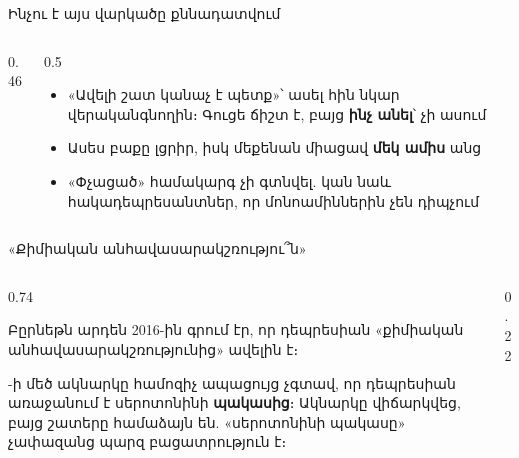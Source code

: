 \begin{frame}{Ինչու է այս վարկածը քննադատվում}
  \begin{columns}[c]
    \begin{column}{0.46\textwidth}
      \centering
      
    \end{column}
    \begin{column}{0.5\textwidth}
      \begin{itemize}
        \item «Ավելի շատ կանաչ է պետք»՝ ասել հին նկար վերականգնողին։ Գուցե ճիշտ է, բայց \textbf{ինչ անել}՝ չի ասում 
        \item<2-> Ասես բաքը լցրիր, իսկ մեքենան միացավ \textbf{մեկ ամիս} անց 
        \item<3-> «Փչացած» համակարգ չի գտնվել. կան նաև հակադեպրեսանտներ, որ մոնոամիններին չեն դիպչում
      \end{itemize}
    \end{column}
  \end{columns}
\end{frame}

\begin{frame}{«Քիմիական անհավասարակշռությու՞ն»}
  \begin{columns}[c]
    \begin{column}{0.74\textwidth}
      \begin{scienceupdate}
        Բըրնեթն արդեն 2016-ին գրում էր, որ դեպրեսիան «քիմիական անհավասարակշռությունից» ավելին է։\par{}-ի մեծ ակնարկը համոզիչ ապացույց չգտավ, որ դեպրեսիան առաջանում է սերոտոնինի \textbf{պակասից}։ Ակնարկը վիճարկվեց, բայց շատերը համաձայն են. «սերոտոնինի պակասը» չափազանց պարզ բացատրություն է։\par\smallskip
      \end{scienceupdate}
    \end{column}
    \begin{column}{0.22\textwidth}
      \centering{}
    \end{column}
  \end{columns}
\end{frame}


